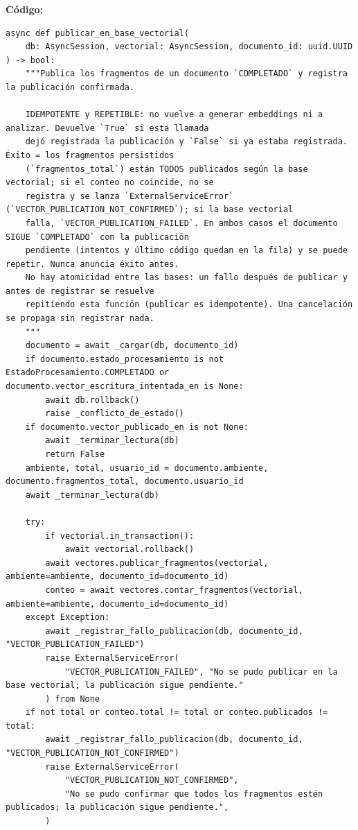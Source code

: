 \documentclass[11pt,a4paper]{article}
\begin{document}
\textbf{Código:}
\begin{lstlisting}
async def publicar_en_base_vectorial(
    db: AsyncSession, vectorial: AsyncSession, documento_id: uuid.UUID
) -> bool:
    """Publica los fragmentos de un documento `COMPLETADO` y registra la publicación confirmada.

    IDEMPOTENTE y REPETIBLE: no vuelve a generar embeddings ni a analizar. Devuelve `True` si esta llamada
    dejó registrada la publicación y `False` si ya estaba registrada. Éxito = los fragmentos persistidos
    (`fragmentos_total`) están TODOS publicados según la base vectorial; si el conteo no coincide, no se
    registra y se lanza `ExternalServiceError` (`VECTOR_PUBLICATION_NOT_CONFIRMED`); si la base vectorial
    falla, `VECTOR_PUBLICATION_FAILED`. En ambos casos el documento SIGUE `COMPLETADO` con la publicación
    pendiente (intentos y último código quedan en la fila) y se puede repetir. Nunca anuncia éxito antes.
    No hay atomicidad entre las bases: un fallo después de publicar y antes de registrar se resuelve
    repitiendo esta función (publicar es idempotente). Una cancelación se propaga sin registrar nada.
    """
    documento = await _cargar(db, documento_id)
    if documento.estado_procesamiento is not EstadoProcesamiento.COMPLETADO or documento.vector_escritura_intentada_en is None:
        await db.rollback()
        raise _conflicto_de_estado()
    if documento.vector_publicado_en is not None:
        await _terminar_lectura(db)
        return False
    ambiente, total, usuario_id = documento.ambiente, documento.fragmentos_total, documento.usuario_id
    await _terminar_lectura(db)

    try:
        if vectorial.in_transaction():
            await vectorial.rollback()
        await vectores.publicar_fragmentos(vectorial, ambiente=ambiente, documento_id=documento_id)
        conteo = await vectores.contar_fragmentos(vectorial, ambiente=ambiente, documento_id=documento_id)
    except Exception:
        await _registrar_fallo_publicacion(db, documento_id, "VECTOR_PUBLICATION_FAILED")
        raise ExternalServiceError(
            "VECTOR_PUBLICATION_FAILED", "No se pudo publicar en la base vectorial; la publicación sigue pendiente."
        ) from None
    if not total or conteo.total != total or conteo.publicados != total:
        await _registrar_fallo_publicacion(db, documento_id, "VECTOR_PUBLICATION_NOT_CONFIRMED")
        raise ExternalServiceError(
            "VECTOR_PUBLICATION_NOT_CONFIRMED",
            "No se pudo confirmar que todos los fragmentos estén publicados; la publicación sigue pendiente.",
        )


\end{lstlisting}
\end{document}
